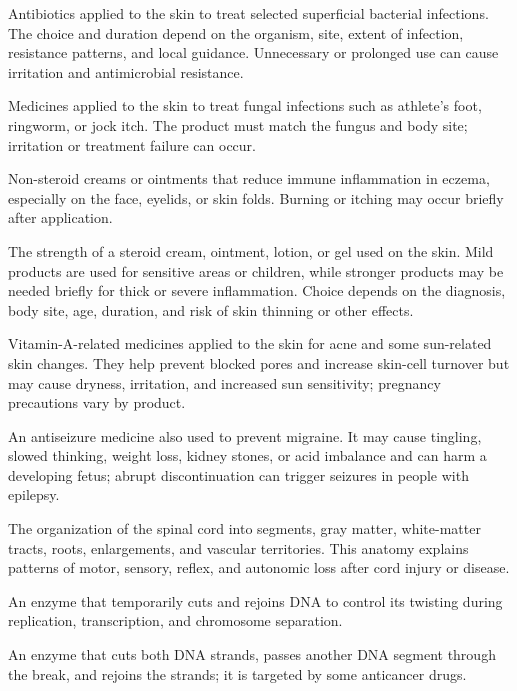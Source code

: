  Antibiotics applied to the skin to treat selected superficial bacterial infections. The choice and
duration depend on the organism, site, extent of infection, resistance patterns, and local
guidance. Unnecessary or prolonged use can cause irritation and antimicrobial resistance.

 Medicines applied to the skin to treat fungal infections such as athlete’s foot, ringworm, or jock itch. The product must match the fungus and body site; irritation or treatment failure can occur.

 Non-steroid creams or ointments that reduce immune inflammation in eczema, especially on the face, eyelids, or skin folds. Burning or itching may occur briefly after application.

 The strength of a steroid cream, ointment, lotion, or gel used on the skin. Mild products are used for sensitive areas or children, while stronger products may be needed briefly for thick or severe inflammation. Choice depends on the diagnosis, body site, age, duration, and risk of skin thinning or other effects.

 Vitamin-A-related medicines applied to the skin for acne and some sun-related skin changes. They help prevent blocked pores and increase skin-cell turnover but may cause dryness, irritation, and increased sun sensitivity; pregnancy precautions vary by product.

 An antiseizure medicine also used to prevent migraine. It may cause tingling, slowed thinking, weight loss, kidney stones, or acid imbalance and can harm a developing fetus; abrupt discontinuation can trigger seizures in people with epilepsy.

 The organization of the spinal cord into segments, gray matter, white-matter tracts, roots, enlargements, and vascular territories. This anatomy explains patterns of motor, sensory, reflex, and autonomic loss after cord injury or disease.

 An enzyme that temporarily cuts and rejoins DNA to control its twisting during replication, transcription, and chromosome separation.

 An enzyme that cuts both DNA strands, passes another DNA segment through the break, and rejoins the strands; it is targeted by some anticancer drugs.

